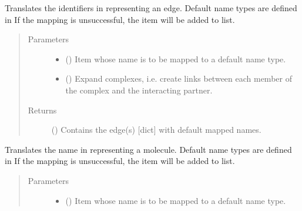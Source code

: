 \documentclass[letterpaper,10pt,english]{sphinxmanual}
\begin{document}
\begin{fulllineitems}
\begin{fulllineitems}
\label{\detokenize{reference:pypath.main.PyPath.map_edge}}
Translates the identifiers in  representing an edge. Default
name types are defined in
 If the mapping
is unsuccessful, the item will be added to
 list.
\begin{quote}\begin{description}
\item[{Parameters}] \leavevmode\begin{itemize}
\item {} 
 () \textendash{} Item whose name is to be mapped to a default name type.

\item {} 
 () \textendash{} Expand complexes, i.e. create links between each member of
the complex and the interacting partner.

\end{itemize}

\item[{Returns}] \leavevmode
() \textendash{} Contains the edge(s) {[}dict{]} with default mapped
names.

\end{description}\end{quote}

\end{fulllineitems}


\begin{fulllineitems}
\label{\detokenize{reference:pypath.main.PyPath.map_item}}
Translates the name in  representing a molecule. Default
name types are defined in
 If the mapping
is unsuccessful, the item will be added to
 list.
\begin{quote}\begin{description}
\item[{Parameters}] \leavevmode\begin{itemize}
\item {} 
 () \textendash{} Item whose name is to be mapped to a default name type.


\end{itemize}
\end{description}
\end{quote}
\end{fulllineitems}
\end{fulllineitems}
\end{document}
